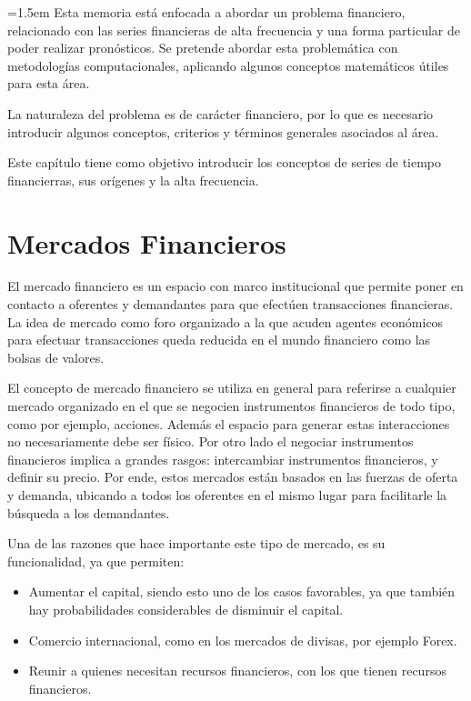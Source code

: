 \parindent=1.5em
Esta memoria está enfocada a abordar un problema financiero, relacionado con las series financieras de alta frecuencia y una forma particular
de poder realizar pronósticos. Se pretende abordar esta problemática con metodologías computacionales, aplicando algunos conceptos matemáticos
útiles para esta área.

La naturaleza del problema es de carácter financiero, por lo que es necesario introducir algunos conceptos, criterios y términos generales
asociados al área.

Este capítulo tiene como objetivo introducir los conceptos de series de tiempo financierras, sus orígenes y la alta frecuencia.

\section{Mercados Financieros}

El mercado financiero es un espacio con marco institucional que permite poner en contacto a oferentes y demandantes para que efectúen
transacciones financieras. La idea de mercado como foro organizado a la que acuden agentes económicos para efectuar transacciones
queda reducida en el mundo financiero como las bolsas de valores.

El concepto de mercado financiero se utiliza en general para referirse a cualquier mercado organizado en el que se negocien instrumentos financieros
de todo tipo, como por ejemplo, acciones. Además el espacio para generar estas interacciones no necesariamente debe ser físico. Por otro lado el negociar
instrumentos financieros implica a grandes rasgos: intercambiar instrumentos financieros, y definir su precio. Por ende, estos mercados están basados en
las fuerzas de oferta y demanda, ubicando a todos los oferentes en el mismo lugar para facilitarle la búsqueda a los demandantes.

Una de las razones que hace importante este tipo de mercado, es su funcionalidad, ya que permiten:
\begin{itemize}
        \item Aumentar el capital, siendo esto uno de los casos favorables, ya que también hay probabilidades considerables de disminuir el capital.
        \item Comercio internacional, como en los mercados de divisas, por ejemplo Forex.
        \item Reunir a quienes necesitan recursos financieros, con los que tienen recursos financieros.
\end{itemize}

